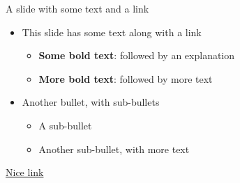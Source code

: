 \begin{frame}{A slide with some text and a link}

  \begin{itemize}
    \item This slide has some text along with a link
      \begin{itemize}
        \item \textbf{Some bold text}: followed by an explanation
        \item \textbf{More bold text}: followed by more text
      \end{itemize}
    \item Another bullet, with sub-bullets
      \begin{itemize}
        \item A sub-bullet
        \item Another sub-bullet, with more text
      \end{itemize}
  \end{itemize}

  \vspace{2ex}
  \begin{center}
    \color{blue} \href{https://github.com/lucabrodohshl/TeamHenklerTemplates}{Nice link}
  \end{center}

\end{frame}
